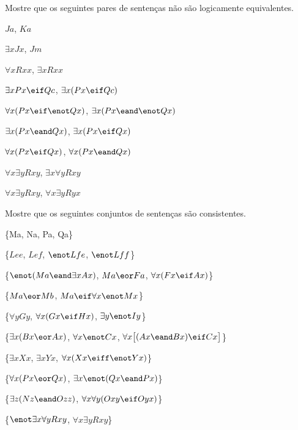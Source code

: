 \solutions
\problempart
\label{pr.NotEquiv}
Mostre que os seguintes pares de sentenças não são logicamente equivalentes.
\begin{earg}
\item $Ja$, $Ka$
\item $\exists x Jx$, $Jm$
\item $\forall x Rxx$, $\exists x Rxx$
\item $\exists x Px \eif Qc$, $\exists x (Px \eif Qc)$
\item $\forall x(Px \eif \enot Qx)$, $\exists x(Px \eand \enot Qx)$
\item $\exists x(Px \eand Qx)$, $\exists x(Px \eif Qx)$
\item $\forall x(Px\eif Qx)$, $\forall x(Px \eand Qx)$
\item $\forall x\exists y Rxy$, $\exists x\forall y Rxy$
\item $\forall x\exists y Rxy$, $\forall x\exists y Ryx$
\end{earg}

\problempart
Mostre que os seguintes conjuntos de sentenças são consistentes.
\begin{earg}
\item \{Ma, \enot Na, Pa, \enot Qa\}
\item \{$Lee$, $Lef$, $\enot Lfe$, $\enot Lff$\}
\item \{$\enot (Ma \eand \exists x Ax)$, $Ma \eor Fa$, $\forall x(Fx \eif Ax)$\}
\item \{$Ma \eor Mb$, $Ma \eif \forall x \enot Mx$\}
\item \{$\forall y Gy$, $\forall x (Gx \eif Hx)$, $\exists y \enot Iy$\}
\item \{$\exists x(Bx \eor Ax)$, $\forall x \enot Cx$, $\forall x\bigl[(Ax \eand Bx) \eif Cx\bigr]$\}
\item \{$\exists x Xx$, $\exists x Yx$, $\forall x(Xx \eiff \enot Yx)$\}
\item \{$\forall x(Px \eor Qx)$, $\exists x\enot(Qx \eand Px)$\}
\item \{$\exists z(Nz \eand Ozz)$, $\forall x\forall y(Oxy \eif Oyx)$\}
\item \{$\enot \exists x \forall y Rxy$, $\forall x \exists y Rxy$\}
\end{earg}

